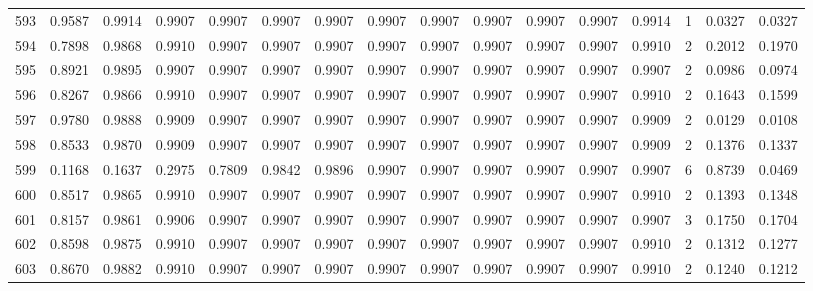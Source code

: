 \begin{tabular}{lrrrrrrrrrrrrrrr}
593 &      0.9587 &  0.9914 &  0.9907 &  0.9907 &  0.9907 &  0.9907 &  0.9907 &  0.9907 &  0.9907 &  0.9907 &   0.9907 &     0.9914 &      1 &                    0.0327 &                     0.0327 \\
594 &      0.7898 &  0.9868 &  0.9910 &  0.9907 &  0.9907 &  0.9907 &  0.9907 &  0.9907 &  0.9907 &  0.9907 &   0.9907 &     0.9910 &      2 &                    0.2012 &                     0.1970 \\
595 &      0.8921 &  0.9895 &  0.9907 &  0.9907 &  0.9907 &  0.9907 &  0.9907 &  0.9907 &  0.9907 &  0.9907 &   0.9907 &     0.9907 &      2 &                    0.0986 &                     0.0974 \\
596 &      0.8267 &  0.9866 &  0.9910 &  0.9907 &  0.9907 &  0.9907 &  0.9907 &  0.9907 &  0.9907 &  0.9907 &   0.9907 &     0.9910 &      2 &                    0.1643 &                     0.1599 \\
597 &      0.9780 &  0.9888 &  0.9909 &  0.9907 &  0.9907 &  0.9907 &  0.9907 &  0.9907 &  0.9907 &  0.9907 &   0.9907 &     0.9909 &      2 &                    0.0129 &                     0.0108 \\
598 &      0.8533 &  0.9870 &  0.9909 &  0.9907 &  0.9907 &  0.9907 &  0.9907 &  0.9907 &  0.9907 &  0.9907 &   0.9907 &     0.9909 &      2 &                    0.1376 &                     0.1337 \\
599 &      0.1168 &  0.1637 &  0.2975 &  0.7809 &  0.9842 &  0.9896 &  0.9907 &  0.9907 &  0.9907 &  0.9907 &   0.9907 &     0.9907 &      6 &                    0.8739 &                     0.0469 \\
600 &      0.8517 &  0.9865 &  0.9910 &  0.9907 &  0.9907 &  0.9907 &  0.9907 &  0.9907 &  0.9907 &  0.9907 &   0.9907 &     0.9910 &      2 &                    0.1393 &                     0.1348 \\
601 &      0.8157 &  0.9861 &  0.9906 &  0.9907 &  0.9907 &  0.9907 &  0.9907 &  0.9907 &  0.9907 &  0.9907 &   0.9907 &     0.9907 &      3 &                    0.1750 &                     0.1704 \\
602 &      0.8598 &  0.9875 &  0.9910 &  0.9907 &  0.9907 &  0.9907 &  0.9907 &  0.9907 &  0.9907 &  0.9907 &   0.9907 &     0.9910 &      2 &                    0.1312 &                     0.1277 \\
603 &      0.8670 &  0.9882 &  0.9910 &  0.9907 &  0.9907 &  0.9907 &  0.9907 &  0.9907 &  0.9907 &  0.9907 &   0.9907 &     0.9910 &      2 &                    0.1240 &                     0.1212 \\

\end{tabular}
